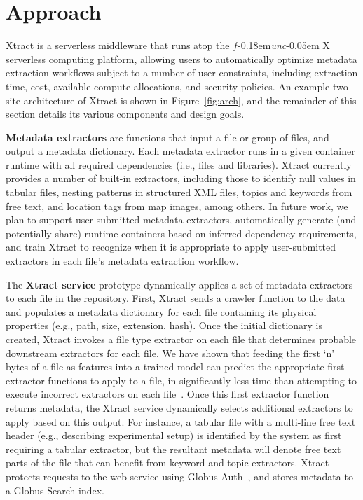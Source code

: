 \documentclass[sigconf, 9pt]{acmart}
\newcommand{\name}{Xtract}
\newcommand{\funcx}{$f$\kern-0.18em\emph{unc}\kern-0.05em X}
\begin{document}
\section{Approach}
\label{sec:approach}

\name{} is a serverless middleware that runs atop the \funcx{} serverless 
computing platform, allowing users to automatically optimize metadata extraction workflows subject to 
a number of user constraints, including extraction time, cost, available compute allocations, and security policies. 
An example two-site architecture of \name{} is shown in Figure~\ref{fig:arch}, and the remainder of this section 
details its various components and design goals.

\textbf{Metadata extractors} are functions that input a file or group of files, and output a metadata dictionary. 
Each metadata extractor runs in a given container runtime with all required dependencies (i.e., files and 
libraries).  \name{} currently provides a number of built-in extractors, including
those to identify null values in tabular files, nesting patterns in structured XML files, topics and keywords from free text, and location tags from map images, 
among others. In future work, 
we plan to support user-submitted metadata extractors, automatically generate (and potentially share) runtime containers based on inferred 
dependency requirements, and train \name{} to recognize when it is appropriate to apply user-submitted extractors in each file's metadata extraction workflow. 

The \textbf{\name{} service} prototype dynamically applies a set of metadata extractors to each file in the repository. 
First, \name{} sends a crawler function to the data and populates a metadata dictionary for each file containing
its physical properties (e.g., path, size, extension, hash).  Once the initial dictionary is created, \name{} invokes a file type extractor on each 
file that determines probable downstream extractors for each file. We have shown that feeding 
the first `n' bytes of a file as features into 
a trained model can predict the appropriate first extractor functions to apply to a file, in significantly less time
than attempting to execute incorrect extractors on each file~\cite{skluzacek2018skluma}. Once this first extractor function returns metadata, the \name{} service dynamically selects additional extractors to apply based on this output.  For instance, 
a tabular file with a multi-line free text header (e.g., describing experimental setup) is identified by the system as first requiring a tabular extractor, but 
the resultant metadata will denote free text parts of the file that can benefit from keyword and topic extractors.
\name{} protects requests to the web service using Globus Auth~\cite{tuecke2016globus}, and stores metadata to a Globus Search index. 
\end{document}
